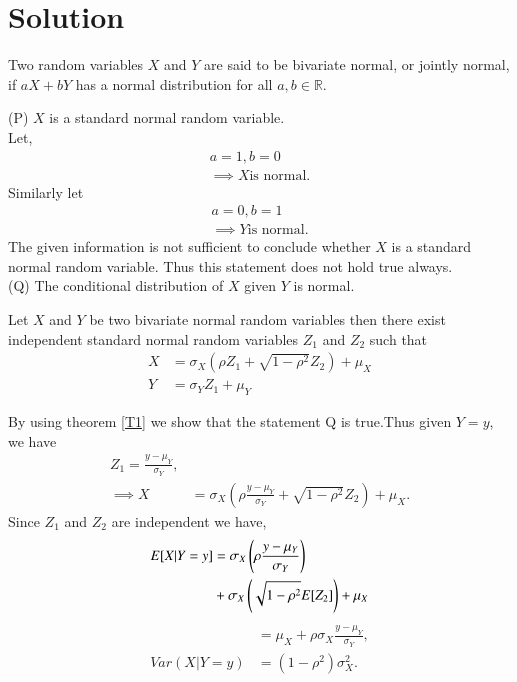 \documentclass[journal,12pt,twocolumn]{IEEEtran}
\begin{document}
\section{Solution}
\begin{definition}
Two random variables $X$ and $Y$ are said to be bivariate normal, or jointly normal, if $aX+bY$ has a normal distribution for all $a,b \in \mathbb{R}$.
\end{definition}
(P) $X$ is a standard normal random  variable.\\
Let,
\begin{align}
 a=1,b=0  \\
  \implies X \text{is normal}.
\end{align}
 Similarly let
 \begin{align}
    a=0,b=1 \\
    \implies Y \text{is normal}.
 \end{align}
The given information is not sufficient to conclude whether $X$ is a standard normal random variable.
Thus this statement does not hold true always.
\\
(Q) The conditional distribution of $X$ given $Y$ is normal.\\
\begin{theorem}
Let $X$ and $Y$ be two bivariate normal random variables then there exist independent standard normal random variables $Z_1$ and $Z_2$ such that \label{T1}
\begin{align}
    X&=\sigma_X (\rho Z_1 +\sqrt{1-\rho^2} Z_2)+\mu_X  \\
    Y&=\sigma_Y Z_1+\mu_Y 
 \end{align}
\end{theorem}
By using theorem \ref{T1} we show that the statement Q is true.Thus given $Y=y$, we have
\begin{align}
Z_1=\frac{y-\mu_Y}{\sigma_Y},\\
\implies X&=\sigma_X (\rho\frac{y-\mu_Y}{\sigma_Y} +\sqrt{1-\rho^2} Z_2)+\mu_X .
\end{align}
Since $Z_1$ and $Z_2$ are independent we have,
\begin{equation}
    \begin{aligned}
  E[X|Y=y]&= \sigma_X \left(\rho\frac{y-\mu_Y}{\sigma_Y}\right) \\ &+\sigma_X\left(\sqrt{1-\rho^2} E[Z_2]\right)+\mu_X
  \end{aligned}
\end{equation}
\begin{align}
 &=\mu_X+ \rho \sigma_X \frac{y-\mu_Y}{\sigma_Y},\\
  Var(X|Y=y)&=(1-\rho^2)\sigma^2_X.     
\end{align}
\end{document}
